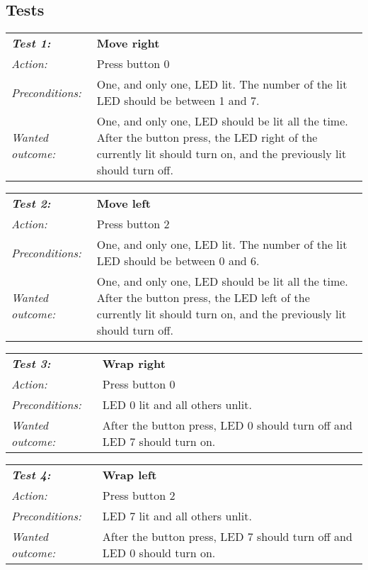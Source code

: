 \subsection{Tests}


\begin{tabular}[h]{|lp{12cm}|} \hline
\textbf{\emph{Test 1:}}   	& \textbf{Move right}\\
\emph{Action:} 		& Press button 0\\
\emph{Preconditions:}	& One, and only one, LED lit. The number of the lit LED should be between 1 and 7.\\
\emph{Wanted outcome:}	& One, and only one, LED should be lit all the time. After the button press, the LED right of the currently lit should turn on, and the previously lit should turn off.\\ \hline
\end{tabular}

\vspace{1cm}

\begin{tabular}[h]{|lp{12cm}|} \hline
\textbf{\emph{Test 2:}} 		& \textbf{Move left}\\
\emph{Action:} 		& Press button 2\\
\emph{Preconditions:}	& One, and only one, LED lit. The number of the lit LED should be between 0 and 6.\\
\emph{Wanted outcome:}	& One, and only one, LED should be lit all the time. After the button press, the LED left of the currently lit should turn on, and the previously lit should turn off. \\ \hline
\end{tabular}

\vspace{1cm}

\begin{tabular}[h]{|lp{12cm}|} \hline
\textbf{\emph{Test 3:}} 		& \textbf{Wrap right}\\
\emph{Action:} 		& Press button 0\\
\emph{Preconditions:}	& LED 0 lit and all others unlit.\\
\emph{Wanted outcome:}	& After the button press, LED 0 should turn off and LED 7 should turn on.\\ \hline
\end{tabular}

\vspace{1cm}

\begin{tabular}[h]{|lp{12cm}|} \hline
\textbf{\emph{Test 4:}} 		& \textbf{Wrap left}\\
\emph{Action:} 		& Press button 2\\
\emph{Preconditions:}	& LED 7 lit and all others unlit.\\
\emph{Wanted outcome:}	& After the button press, LED 7 should turn off and LED 0 should turn on.\\ \hline
\end{tabular}

